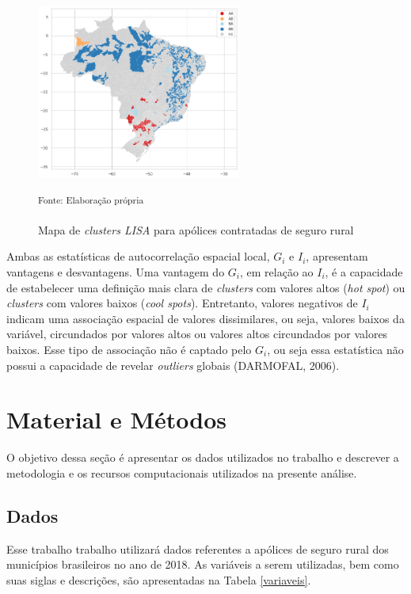 \documentclass[12pt, a4paper,brazil,oneside]{article}
\begin{document}
	\begin{figure}[h!]
		\centering
		\includegraphics[width=0.6\textwidth]{img/liza_ex.png}
		\caption{Mapa de \textit{clusters LISA} para apólices contratadas de seguro rural}
		\small \textsuperscript {Fonte: Elaboração própria}
		\label{lisa_ex}
	\end{figure}
	
	Ambas as estatísticas de autocorrelação espacial local, $G_i$ e $I_i$, apresentam vantagens e desvantagens. Uma vantagem do $G_i$, em relação ao $I_i$, é a capacidade de estabelecer uma definição mais clara de \textit{clusters} com valores altos  (\textit{hot spot}) ou \textit{clusters} com valores baixos (\textit{cool spots}). Entretanto, valores negativos de $I_i$ indicam uma associação espacial de valores dissimilares, ou seja, valores baixos da variável, circundados por valores altos ou valores altos circundados por valores baixos. Esse tipo de associação não é captado pelo $G_i$, ou seja essa estatística não possui a capacidade de revelar \textit{outliers} globais (DARMOFAL, 2006).
	
	
	\newpage
	\section{Material e Métodos}\label{metodologia}
	
	O objetivo dessa seção é apresentar os dados utilizados no trabalho e descrever a metodologia e os recursos computacionais utilizados na presente análise.
	
	\subsection{Dados}
	
	Esse trabalho trabalho utilizará dados referentes a apólices de seguro rural dos municípios brasileiros no ano de 2018. As variáveis a serem utilizadas, bem como suas siglas e descrições, são apresentadas na Tabela \ref{variaveis}.
	
\end{document}
